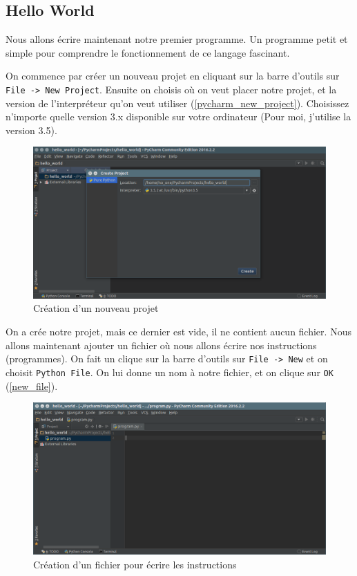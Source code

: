 \documentclass[12pt]{article}
\newcommand{\code}[1]{\colorbox{light-gray}{\texttt{#1}}}
\begin{document}
\clearpage

    \subsection{Hello World}
        Nous allons écrire maintenant notre premier programme. Un programme petit et simple pour comprendre le
        fonctionnement de ce langage fascinant.

        On commence par créer un nouveau projet en cliquant sur la barre d'outils sur \code{File -> New Project}. Ensuite on choisis où on veut placer notre projet, et la version de l'interpréteur qu'on veut utiliser
        (\autoref{pycharm_new_project}). Choisissez n'importe quelle version 3.x disponible sur votre ordinateur
        (Pour moi, j'utilise la version 3.5).

        \begin{figure}[H]
            \centering
            \includegraphics[width=\linewidth]{img/9_new_project.png}
            \caption{Création d'un nouveau projet}
            \label{pycharm_new_project}
        \end{figure}

        On a crée notre projet, mais ce dernier est vide, il ne contient aucun fichier. Nous allons maintenant ajouter
        un fichier où nous allons écrire nos instructions (programmes). On fait un clique sur la barre d'outils sur
        \code{File -> New} et on choisit \code{Python File}. On lui donne un nom à notre fichier, et on clique sur
        \code{OK} (\autoref{new_file}).

        \begin{figure}[H]
            \centering
            \includegraphics[width=\linewidth]{img/10_new_file.png}
            \caption{Création d'un fichier pour écrire les instructions}
            \label{new_file}
        \end{figure}
\end{document}
